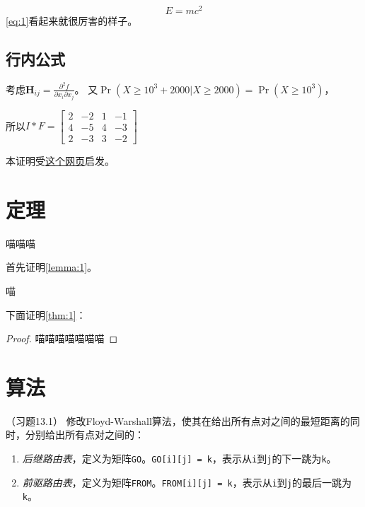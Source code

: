 \documentclass{dreamClass}
\begin{document}
\begin{equation}\label{eq:1}
    E = mc^2
\end{equation}
\cref{eq:1}看起来就很厉害的样子。

\subsection{行内公式}
考虑\(\mathbf{H}_{i j}=\frac{\partial^{2} f}{\partial x_{i} \partial x_{j}}\)。
又\(\operatorname{Pr}(X \geq 10^3 + 2000 | X \geq 2000) = \operatorname{Pr}(X \geq 10^3)\)，

所以\(I * F = \begin{bmatrix}
    2 & -2  & 1 & - 1 \\
    4 & - 5 & 4 & - 3 \\
    2 & - 3 & 3 & - 2
\end{bmatrix}\)

本证明受\href{https://datawhalechina.github.io/pumpkin-book/#/chapter2/chapter2?id=221}{这个网页}启发。

\section{定理}
\begin{theorem}\label{thm:1}
    喵喵喵
\end{theorem}

首先证明\cref{lemma:1}。
\begin{lemma}\label{lemma:1}
    喵
\end{lemma}

下面证明\cref{thm:1}：
\begin{proof}
    喵喵喵喵喵喵喵
\end{proof}


\section{算法}
\begin{problem}（习题13.1）
修改Floyd-Warshall算法，使其在给出所有点对之间的最短距离的同时，分别给出所有点对之间的：
\begin{enumerate}
    \item \emph{后继路由表}，定义为矩阵\texttt{GO}。\texttt{GO[i][j] = k}，表示从\texttt{i}到\texttt{j}的下一跳为\texttt{k}。
    \item \emph{前驱路由表}，定义为矩阵\texttt{FROM}。\texttt{FROM[i][j] = k}，表示从\texttt{i}到\texttt{j}的最后一跳为\texttt{k}。
\end{enumerate}
\end{problem}
\end{document}
